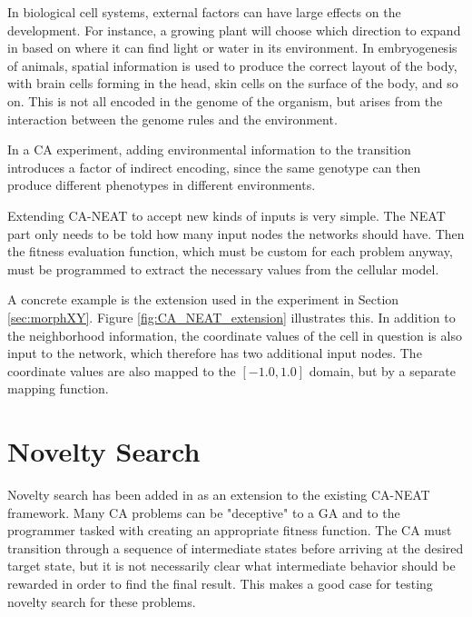 In biological cell systems, external factors can have large effects on the development.
For instance, a growing plant will choose which direction to expand in based on where it can find light or water in its environment.
In embryogenesis of animals,
spatial information is used to produce the correct layout of the body,
with brain cells forming in the head, skin cells on the surface of the body, and so on.
This is not all encoded in the genome of the organism, but arises from the interaction between the genome rules and the environment.

In a CA experiment, adding environmental information to the transition introduces a factor of indirect encoding,
since the same genotype can then produce different phenotypes in different environments.

Extending CA-NEAT to accept new kinds of inputs is very simple.
The NEAT part only needs to be told how many input nodes the networks should have.
Then the fitness evaluation function, which must be custom for each problem anyway,
must be programmed to extract the necessary values from the cellular model.

A concrete example is the extension used in the experiment in Section \ref{sec:morphXY}.
Figure \ref{fig:CA_NEAT_extension} illustrates this.
In addition to the neighborhood information, the coordinate values of the cell in question is also input to the network, which therefore has two additional input nodes.
The coordinate values are also mapped to the $[-1.0, 1.0]$ domain, but by a separate mapping function.

\section{Novelty Search}
\label{sec:novelty}
Novelty search has been added in as an extension to the existing CA-NEAT framework.
Many CA problems can be "deceptive" to a GA and to the programmer tasked with creating an appropriate fitness function.
The CA must transition through a sequence of intermediate states before arriving at the desired target state,
but it is not necessarily clear what intermediate behavior should be rewarded in order to find the final result.
This makes a good case for testing novelty search for these problems.


